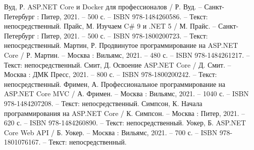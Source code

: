 \begin{thebibliography}{9}
     Вуд, Р. ASP.NET Core и Docker для профессионалов / Р. Вуд. – Санкт-Петербург : Питер, 2021. – 500 с. – ISBN 978-1484260586. – Текст: непосредственный.
     Прайс, М. Изучаем C\# 9 и .NET 5 / М. Прайс. – Санкт-Петербург : Питер, 2021. – 500 с. – ISBN 978-1800200723. – Текст: непосредственный.
     Мартин, Р. Продвинутое программирование на ASP.NET Core / Р. Мартин. – Москва : Вильямс, 2021. – 480 с. – ISBN 978-1484261217. – Текст: непосредственный.
     Смит, Д. Освоение ASP.NET Core / Д. Смит. – Москва : ДМК Пресс, 2021. – 800 с. – ISBN 978-1800200242. – Текст: непосредственный.
     Фримен, А. Профессиональное программирование на ASP.NET Core MVC / А. Фримен. – Москва : Вильямс, 2021. – 1040 с. – ISBN 978-1484207208. – Текст: непосредственный.
     Симпсон, К. Начала программирования на ASP.NET Core / К. Симпсон. – Москва : Питер, 2021. – 620 с. – ISBN 978-1484260890. – Текст: непосредственный.
     Уокер, Б. ASP.NET Core Web API / Б. Уокер. – Москва : Вильямс, 2021. – 700 с. – ISBN 978-1801076167. – Текст: непосредственный.
\end{thebibliography}

